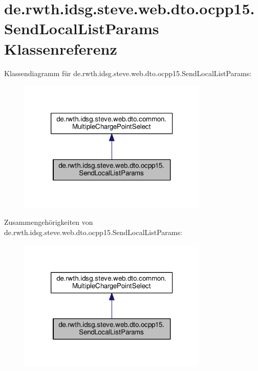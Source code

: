 \hypertarget{classde_1_1rwth_1_1idsg_1_1steve_1_1web_1_1dto_1_1ocpp15_1_1_send_local_list_params}{\section{de.\-rwth.\-idsg.\-steve.\-web.\-dto.\-ocpp15.\-Send\-Local\-List\-Params Klassenreferenz}
\label{classde_1_1rwth_1_1idsg_1_1steve_1_1web_1_1dto_1_1ocpp15_1_1_send_local_list_params}
}


Klassendiagramm für de.\-rwth.\-idsg.\-steve.\-web.\-dto.\-ocpp15.\-Send\-Local\-List\-Params\-:\nopagebreak
\begin{figure}[H]
\begin{center}
\leavevmode
\includegraphics[width=256pt]{classde_1_1rwth_1_1idsg_1_1steve_1_1web_1_1dto_1_1ocpp15_1_1_send_local_list_params__inherit__graph}
\end{center}
\end{figure}


Zusammengehörigkeiten von de.\-rwth.\-idsg.\-steve.\-web.\-dto.\-ocpp15.\-Send\-Local\-List\-Params\-:\nopagebreak
\begin{figure}[H]
\begin{center}
\leavevmode
\includegraphics[width=256pt]{classde_1_1rwth_1_1idsg_1_1steve_1_1web_1_1dto_1_1ocpp15_1_1_send_local_list_params__coll__graph}
\end{center}
\end{figure}
